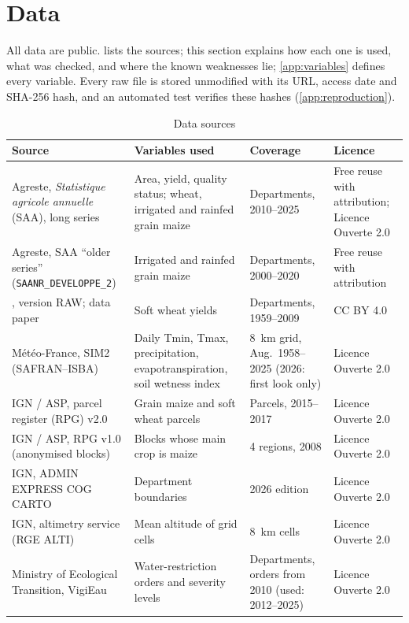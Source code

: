 \section{Data}
\label{sec:data}

All data are public.  lists the sources; this section explains how each one is used, what was checked, and where the known weaknesses lie; \cref{app:variables} defines every variable. Every raw file is stored unmodified with its URL, access date and SHA-256 hash, and an automated test verifies these hashes (\cref{app:reproduction}).

\begin{table}[tp]
\centering
\scriptsize
\caption{Data sources}
\label{tab:sources}
\begin{tabular}{>{\raggedright}p{4.4cm}>{\raggedright}p{4.3cm}>{\raggedright}p{2.6cm}>{\raggedright\arraybackslash}p{2.6cm}}
\toprule
Source & Variables used & Coverage & Licence \\
\midrule
Agreste, \emph{Statistique agricole annuelle} (SAA), long series & Area, yield, quality status; wheat, irrigated and rainfed grain maize & Departments, 2010--2025 & Free reuse with attribution; Licence Ouverte 2.0 \\
Agreste, SAA ``older series'' (\texttt{SAANR\_DEVELOPPE\_2}) & Irrigated and rainfed grain maize & Departments, 2000--2020 & Free reuse with attribution \\
\textcite{schauberger2021data}, version RAW; data paper \textcite{schauberger2022} & Soft wheat yields & Departments, 1959--2009 & CC BY 4.0 \\
Météo-France, SIM2 (SAFRAN--ISBA) & Daily Tmin, Tmax, precipitation, evapotranspiration, soil wetness index & 8~km grid, Aug.~1958--2025 (2026: first look only) & Licence Ouverte 2.0 \\
IGN / ASP, parcel register (RPG) v2.0 & Grain maize and soft wheat parcels & Parcels, 2015--2017 & Licence Ouverte 2.0 \\
IGN / ASP, RPG v1.0 (anonymised blocks) & Blocks whose main crop is maize & 4 regions, 2008 & Licence Ouverte 2.0 \\
IGN, ADMIN EXPRESS COG CARTO & Department boundaries & 2026 edition & Licence Ouverte 2.0 \\
IGN, altimetry service (RGE ALTI) & Mean altitude of grid cells & 8~km cells & Licence Ouverte 2.0 \\
Ministry of Ecological Transition, VigiEau & Water-restriction orders and severity levels & Departments, orders from 2010 (used: 2012--2025) & Licence Ouverte 2.0 \\

\end{tabular}
\end{table}
